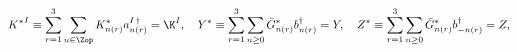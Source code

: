 \begin{equation}
{K^*}^I\equiv\sum_{r=1}^3\sum_{n\in\Zop}K^*_{n(r)}a_{n(r)}^{I\,\dag} = \K^I,\quad
Y^*\equiv\sum_{r=1}^3\sum_{n\ge 0}\bar{G}^*_{n(r)}b_{n(r)}^{\dag}=Y,\quad
Z^*\equiv\sum_{r=1}^3\sum_{n\ge 0}\bar{G}^*_{n(r)}b_{-n(r)}^{\dag} = Z,
\end{equation}

